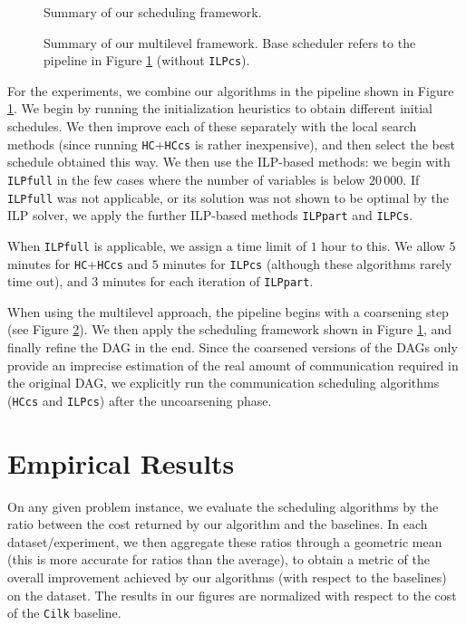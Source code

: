 \documentclass[sigconf,nonacm]{acmart}
\begin{document}
\begin{figure}
    \centering
    
    \caption{Summary of our scheduling framework.}
    \label{fig:pipeline1}
\end{figure}

\begin{figure}
    \centering
    \hspace{32pt}
    
    \caption{Summary of our multilevel framework. Base scheduler refers to the pipeline in Figure \ref{fig:pipeline1} (without \texttt{ILPcs}).}
    \label{fig:pipeline2}
\end{figure}

For the experiments, we combine our algorithms in the pipeline shown in Figure \ref{fig:pipeline1}. We begin by running the initialization heuristics to obtain different initial schedules. We then improve each of these separately with the local search methods (since running \texttt{HC}+\texttt{HCcs} is rather inexpensive), and then select the best schedule obtained this way. We then use the ILP-based methods: we begin with \texttt{ILPfull} in the few cases where the number of variables is below $20_{\,}000$. If \texttt{ILPfull} was not applicable, or its solution was not shown to be optimal by the ILP solver, we apply the further ILP-based methods \texttt{ILPpart} and \texttt{ILPCs}.

When \texttt{ILPfull} is applicable, we assign a time limit of $1$ hour to this. We allow $5$ minutes for \texttt{HC}+\texttt{HCcs} and $5$ minutes for \texttt{ILPcs} (although these algorithms rarely time out), and $3$ minutes for each iteration of \texttt{ILPpart}.

When using the multilevel approach, the pipeline begins with a coarsening step (see Figure \ref{fig:pipeline2}). We then apply the scheduling framework shown in Figure \ref{fig:pipeline1}, and finally refine the DAG in the end. Since the coarsened versions of the DAGs only provide an imprecise estimation of the real amount of communication required in the original DAG, we explicitly run the communication scheduling algorithms (\texttt{HCcs} and \texttt{ILPcs}) after the uncoarsening phase.

\section{Empirical Results} \label{sec:exp}

On any given problem instance, we evaluate the scheduling algorithms by the ratio between the cost returned by our algorithm and the baselines. In each dataset/experiment, we then aggregate these ratios through a geometric mean (this is more accurate for ratios than the average), to obtain a metric of the overall improvement achieved by our algorithms (with respect to the baselines) on the dataset. The results in our figures are normalized with respect to the cost of the \texttt{Cilk} baseline.
\end{document}
